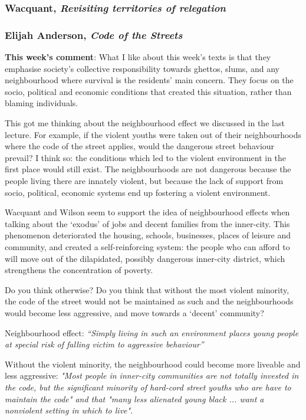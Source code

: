 \documentclass{article}
\begin{document}
\subsubsection{Wacquant, \textit{Revisiting territories of relegation}}

\subsubsection{Elijah Anderson, \textit{Code of the Streets}}

\begin{outline}
	\1 \textbf{This week's comment}:
	What I like about this week's texts is that they emphasise society's collective responsibility towards ghettos, slums, and any neighbourhood where survival is the residents' main concern. They focus on the socio, political and economic conditions that created this situation, rather than blaming individuals.
 
This got me thinking about the neighbourhood effect we discussed in the last lecture. For example, if the violent youths were taken out of their neighbourhoods where the code of the street applies, would the dangerous street behaviour prevail? I think so: the conditions which led to the violent environment in the first place would still exist. The neighbourhoods are not dangerous because the people living there are innately violent, but because the lack of support from socio, political, economic systems end up fostering a violent environment.

Wacquant and Wilson seem to support the idea of neighbourhood effects when talking about the `exodus' of jobs and decent families from the inner-city. This phenomenon deteriorated the housing, schools, businesses, places of leisure and community, and created a self-reinforcing system: the people who can afford to will move out of the dilapidated, possibly dangerous inner-city district, which strengthens the concentration of poverty.

Do you think otherwise? Do you think that without the most violent minority, the code of the street would not be maintained as such and the neighbourhoods would become less aggressive, and move towards a `decent' community?

	\1 Neighbourhood effect: \textit{``Simply living in such an environment places young people at special risk of falling victim to aggressive behaviour''}
	
	\1 Without the violent minority, the neighbourhood could become more liveable and less aggressive: \textit{"Most people in inner-city communities are not totally invested in the code, but the significant minority of hard-cord street youths who are have to maintain the code" and that "many less alienated young black ... want a nonviolent setting in which to live"}. 


\end{outline}
\end{document}
